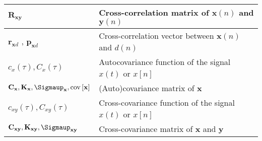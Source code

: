 \begin{xltabular}{\textwidth}{XX}
	\(\mathbf{R}_\mathbf{xy}\)                                                                                                    & Cross-correlation matrix of \(\mathbf{x}(n)\) and \(\mathbf{y}(n)\)                                                                                                                                                                \\ \hline
	\(\mathbf{r}_{\mathbf{x}d}\) \cite{haykinNeuralNetworksLearning2009}, \(\mathbf{p}_{\mathbf{x}d}\) \cite{dinizAdaptiveFilteringAlgorithms2002}                                                                                                  & Cross-correlation vector between \(\mathbf{x}(n)\) and \(d(n)\)                                                                                                                                  \\ \hline
	\(c_x(\tau), C_x(\tau)\)                                                                                                      & Autocovariance function of the signal \(x(t)\) or \(x[n]\) \cite{nossekAdaptiveArraySignal2015}                                                                                                                                    \\ \hline
	\(\mathbf{C}_\mathbf{x}, \mathbf{K}_\mathbf{x}, \boldsymbol{\Sigmaup}_\mathbf{x}, \textnormal{cov}\left[ \mathbf{x} \right]\) & (Auto)covariance matrix of \(\mathbf{x}\) \cite{vantreesOptimumArrayProcessing2002,proakisDigitalCommunications2007,leon-garciaProbabilityStatisticsRandom2007,haykinAdaptiveFilterTheory2002,bishopPatternRecognitionMachine2006} \\ \hline
	\(c_{xy}(\tau), C_{xy}(\tau)\)                                                                                                & Cross-covariance function of the signal \(x(t)\) or \(x[n]\) \cite{nossekAdaptiveArraySignal2015}                                                                                                                                  \\ \hline
	\(\mathbf{C}_{\mathbf{xy}}, \mathbf{K}_{\mathbf{xy}}, \boldsymbol{\Sigmaup}_{\mathbf{xy}}\)                                   & Cross-covariance matrix of \(\mathbf{x}\) and \(\mathbf{y}\)
\end{xltabular}

